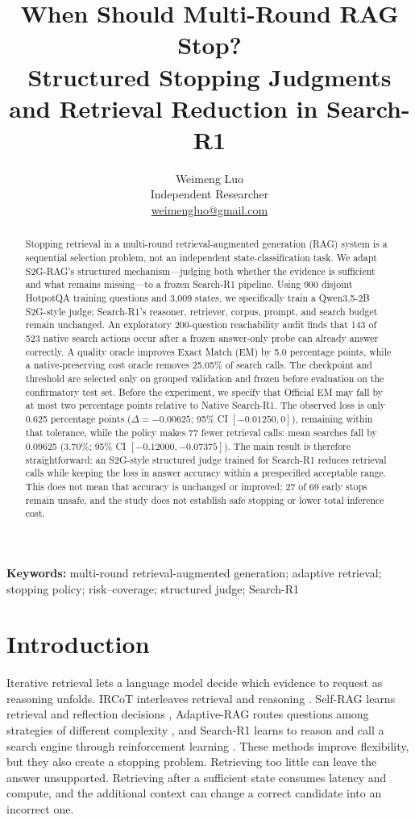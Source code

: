 \documentclass[11pt,a4paper]{article}
\title{When Should Multi-Round RAG Stop?\\Structured Stopping Judgments and Retrieval Reduction in Search-R1}
\author{Weimeng Luo\\
\small Independent Researcher\\
\small \href{mailto:weimengluo@gmail.com}{weimengluo@gmail.com}}
\date{}
\begin{document}
\maketitle

\begin{abstract}
Stopping retrieval in a multi-round retrieval-augmented generation (RAG) system is a sequential selection problem, not an independent state-classification task. We adapt S2G-RAG's structured mechanism---judging both whether the evidence is sufficient and what remains missing---to a frozen Search-R1 pipeline. Using 900 disjoint HotpotQA training questions and 3,009 states, we specifically train a Qwen3.5-2B S2G-style judge; Search-R1's reasoner, retriever, corpus, prompt, and search budget remain unchanged. An exploratory 200-question reachability audit finds that 143 of 523 native search actions occur after a frozen answer-only probe can already answer correctly. A quality oracle improves Exact Match (EM) by 5.0 percentage points, while a native-preserving cost oracle removes 25.05\% of search calls. The checkpoint and threshold are selected only on grouped validation and frozen before evaluation on the confirmatory test set. Before the experiment, we specify that Official EM may fall by at most two percentage points relative to Native Search-R1. The observed loss is only 0.625 percentage points ($\Delta=-0.00625$; 95\% CI $[-0.01250,0]$), remaining within that tolerance, while the policy makes 77 fewer retrieval calls: mean searches fall by 0.09625 (3.70\%; 95\% CI $[-0.12000,-0.07375]$). The main result is therefore straightforward: an S2G-style structured judge trained for Search-R1 reduces retrieval calls while keeping the loss in answer accuracy within a prespecified acceptable range. This does not mean that accuracy is unchanged or improved; 27 of 69 early stops remain unsafe, and the study does not establish safe stopping or lower total inference cost.
\end{abstract}

\noindent\textbf{Keywords:} multi-round retrieval-augmented generation; adaptive retrieval; stopping policy; risk--coverage; structured judge; Search-R1

\section{Introduction}

Iterative retrieval lets a language model decide which evidence to request as reasoning unfolds. IRCoT interleaves retrieval and reasoning \citep{trivedi2023ircot}. Self-RAG learns retrieval and reflection decisions \citep{asai2023selfrag}, Adaptive-RAG routes questions among strategies of different complexity \citep{jeong2024adaptiverag}, and Search-R1 learns to reason and call a search engine through reinforcement learning \citep{jin2025searchr1}. These methods improve flexibility, but they also create a stopping problem. Retrieving too little can leave the answer unsupported. Retrieving after a sufficient state consumes latency and compute, and the additional context can change a correct candidate into an incorrect one.
\end{document}
